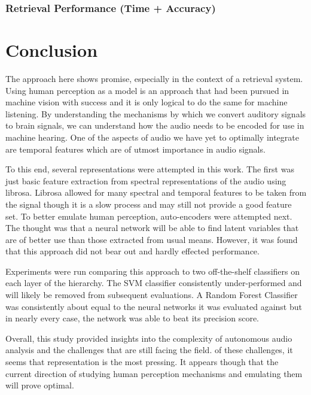 \subsubsection{Retrieval Performance (Time + Accuracy)}


\section{Conclusion}
The approach here shows promise, especially in the context of a retrieval
system. Using human perception as a model is an approach that had been pursued
in machine vision with success and it is only logical to do the same for machine
listening. By understanding the mechanisms by which we convert auditory signals
to brain signals, we can understand how the audio needs to be encoded for use in
machine hearing. One of the aspects of audio we have yet to optimally integrate
are temporal features which are of utmost importance in audio signals.

To this end, several representations were attempted in this work. The first was
just basic feature extraction from spectral representations of the audio using
librosa. Librosa allowed for many spectral and temporal features to be taken
from the signal though it is a slow process and may still not provide a good
feature set. To better emulate human perception, auto-encoders were attempted
next. The thought was that a neural network will be able to find latent
variables that are of better use than those extracted from usual means. However,
it was found that this approach did not bear out and hardly effected
performance.

Experiments were run comparing this approach to two off-the-shelf classifiers on
each layer of the hierarchy. The SVM classifier consistently under-performed and
will likely be removed from subsequent evaluations. A Random Forest Classifier
was consistently about equal to the neural networks it was evaluated against but
in nearly every case, the network was able to beat its precision score.

Overall, this study provided insights into the complexity of autonomous audio
analysis and the challenges that are still facing the field. of these
challenges, it seems that representation is the most pressing. It appears though
that the current direction of studying human perception mechanisms and emulating
them will prove optimal.

